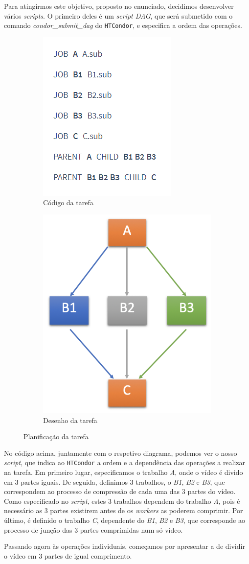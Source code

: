 \documentclass[a4paper]{report}
\begin{document}
    Para atingirmos este objetivo, proposto no enunciado, decidimos desenvolver vários \textit{scripts}. O primeiro deles é um \textit{script DAG}, que será submetido com o comando \textit{condor\_submit\_dag} do \texttt{HTCondor}, e especifica a ordem das operações.

	\begin{figure}[H]
		\centering
		\begin{subfigure}{.5\textwidth}
			\centering
			\includegraphics[width=.4\linewidth]{DAG.png}
			\caption{Código da tarefa}
			\label{fig:sub1}
		\end{subfigure}%
		\begin{subfigure}{.5\textwidth}
			\centering
			\includegraphics[width=.4\linewidth]{Arquitetura-HTCondor.png}
			\caption{Desenho da tarefa}
			\label{fig:sub2}
		\end{subfigure}
		\caption{Planificação da tarefa}
		\label{fig:dag}
	\end{figure}
	\large{
		No código acima, juntamente com o respetivo diagrama, podemos ver o nosso \textit{script}, que indica ao \texttt{HTCondor} a ordem e a dependência das operações a realizar na tarefa. Em primeiro lugar, especificamos o trabalho \textit{A}, onde o vídeo é divido em 3 partes iguais. De seguida, definimos 3 trabalhos, o \textit{B1}, \textit{B2} e \textit{B3}, que correspondem ao processo de compressão de cada uma das 3 partes do vídeo. 
		Como especificado no \textit{script}, estes 3 trabalhos dependem do trabalho \textit{A}, pois é necessário as 3 partes existirem antes de os \textit{workers} as poderem comprimir. Por último, é definido o trabalho \textit{C}, dependente do \textit{B1}, \textit{B2} e \textit{B3}, que corresponde ao processo de junção das 3 partes comprimidas num só vídeo.
		
		Passando agora às operações individuais, começamos por apresentar a de dividir o vídeo em 3 partes de igual comprimento.
	}
	
\end{document}
